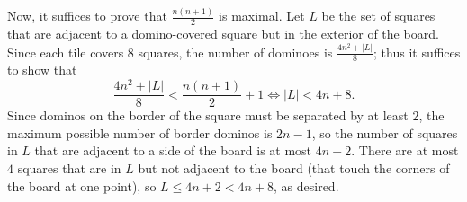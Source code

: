 Now, it suffices to prove that $\tfrac{n(n+1)}2$ is maximal. Let $L$ be the set of squares that are adjacent to a domino-covered square but in the exterior of the board. Since each tile covers $8$ squares, the number of dominoes is $\tfrac{4n^2+|L|}8$; thus it suffices to show that \[\frac{4n^2+|L|}8<\frac{n(n+1)}2+1\iff |L|<4n+8.\]
Since dominos on the border of the square must be separated by at least $2$, the maximum possible number of border dominos is $2n-1$, so the number of squares in $L$ that are adjacent to a side of the board is at most $4n-2$. There are at most $4$ squares that are in $L$ but not adjacent to the board (that touch the corners of the board at one point), so $L\le 4n+2<4n+8$, as desired.
